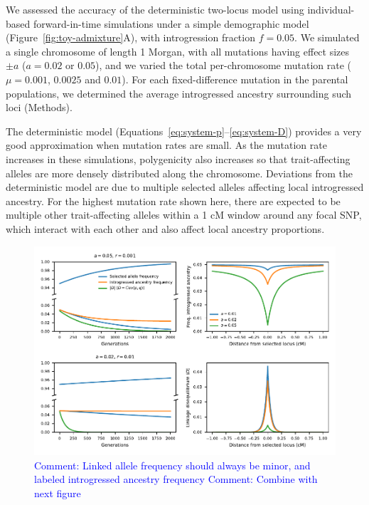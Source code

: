 \documentclass{article}
\newcommand{\aprcomment}[1]{{\textcolor{blue}{Comment: #1}}}
\begin{document}
We assessed the accuracy of the deterministic two-locus model using
individual-based forward-in-time simulations \citep{thornton2019polygenic}
under a simple demographic model (Figure~\ref{fig:toy-admixture}A), with
introgression fraction \(f=0.05\). We simulated a single chromosome of length 1
Morgan, with all mutations having effect sizes \(\pm a\) (\(a=0.02\) or
\(0.05\)), and we varied the total per-chromosome mutation rate (\(\mu=0.001\),
\(0.0025\) and \(0.01\)). For each fixed-difference mutation in the parental
populations, we determined the average introgressed ancestry surrounding such
loci (Methods).

The deterministic model (Equations~\ref{eq:system-p}--\ref{eq:system-D})
provides a very good approximation when mutation rates are small. As the
mutation rate increases in these simulations, polygenicity also increases so
that trait-affecting alleles are more densely distributed along the chromosome.
Deviations from the deterministic model are due to multiple selected alleles
affecting local introgressed ancestry. For the highest mutation rate shown
here, there are expected to be multiple other trait-affecting alleles within a
1 cM window around any focal SNP, which interact with each other and also
affect local ancestry proportions.

\begin{figure}[t!]
    \centering
    \includegraphics{../figures/linkage_predictions.pdf}
    \caption{
        \textbf{}
        \aprcomment{Linked allele frequency should always be minor, and labeled
        introgressed ancestry frequency}
        \aprcomment{Combine with next figure}
    }
    \label{fig:linkage-pred}
\end{figure}
\end{document}
